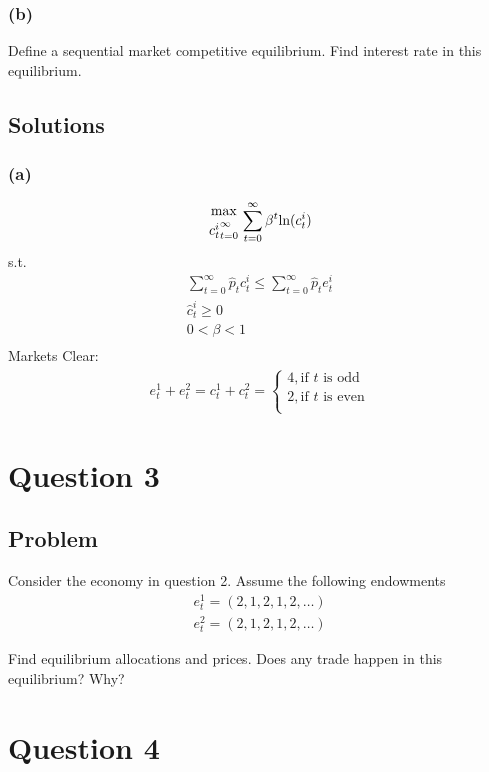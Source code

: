 \documentclass[10pt, a4paper]{article}
\begin{document}
    \subsubsection*{(b)}
      Define a sequential market competitive equilibrium. Find interest rate in this equilibrium.

  \subsection*{Solutions}
    \subsubsection*{(a)}
      \begin{gather*}
        {\max\atop{c_t^i}_{t=0}^{\infty}}\sum\limits_{t=0}^{\infty}\beta^t\text{ln}(c_t^i)
      \end{gather*}
      s.t.
      \begin{gather*}
        \sum\limits_{t=0}^{\infty}\hat{p}_tc_t^i\leq\sum\limits_{t=0}^{\infty}\hat{p}_te_t^i \\
        \hat{c}_t^i\geq0 \\
        0<\beta<1 \\
      \end{gather*}
      Markets Clear:
      \begin{gather*}
        e_t^1+e_t^2 = c_t^1+c_t^2 = \begin{cases}
          4, \text{if $t$ is odd} \\
          2, \text{if $t$ is even} \\
        \end{cases}
      \end{gather*}
\section*{Question 3}
  \subsection*{Problem}
    Consider the economy in question 2. Assume the following endowments
    \begin{gather*}
      e^1_t = (2,1,2,1,2,\ldots)\\
      e^2_t = (2,1,2,1,2,\ldots)
    \end{gather*}

    Find equilibrium allocations and prices. Does any trade happen in this equilibrium? Why?

\section*{Question 4}
\end{document}
